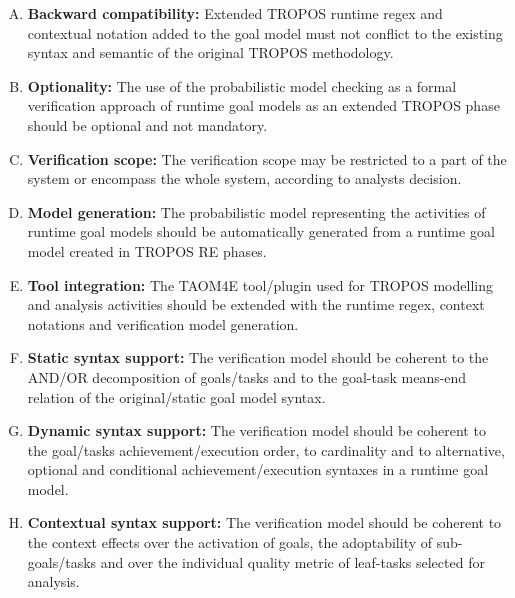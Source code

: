 \begin{enumerate}[R.1]

\item \textbf{Backward compatibility:} Extended TROPOS runtime regex and contextual notation added to the goal model must not conflict to the existing syntax and semantic of the original TROPOS methodology.

\item \textbf{Optionality:} The use of the probabilistic model checking as a formal verification approach of runtime goal models as an extended TROPOS phase should be optional and not mandatory.
\medskip

\item \textbf{Verification scope:} The verification scope may be restricted to a part of the system or encompass the whole system, according to analysts decision.
\medskip

\item \textbf{Model generation:} The probabilistic model representing the activities of runtime goal models should be automatically generated from a runtime goal model created in TROPOS RE phases.
\medskip

\item \textbf{Tool integration:} The TAOM4E tool/plugin used for TROPOS modelling and analysis activities should be extended with the runtime regex, context notations and verification model generation.
\medskip

\item \textbf{Static syntax support:} The verification model should be coherent to the AND/OR decomposition of goals/tasks and to the goal-task means-end relation of the original/static goal model syntax.
\medskip

\item \textbf{Dynamic syntax support:} The verification model should be coherent to the goal/tasks achievement/execution order, to cardinality and to alternative, optional and conditional achievement/execution syntaxes in a runtime goal model.
\medskip

\item \textbf{Contextual syntax support:} The verification model should be coherent to the context effects over the activation of goals, the adoptability of sub-goals/tasks and over the individual quality metric of leaf-tasks selected for analysis. 

\end{enumerate}